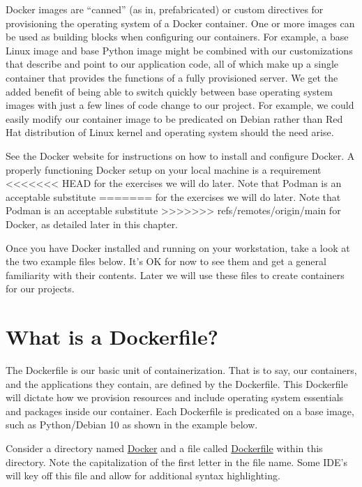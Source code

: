\justify{}
Docker images are ``canned'' (as in, prefabricated) or custom directives
for provisioning the operating system of a Docker container. One or more
images can be used as building blocks when configuring our containers.
For example, a base Linux image and base Python image might be combined
with our customizations that describe and point to our application code,
all of which make up a single container that provides the functions of
a fully provisioned server. We get the added
benefit of being able to switch quickly between base operating system
images with just a few lines of code change to our project. For example,
we could easily modify our container image to be predicated on Debian
rather than Red Hat distribution of Linux kernel and operating system
should the need arise.

\justify{}
See the Docker website for instructions on how to install and configure
Docker. A properly functioning Docker setup on your local machine is a requirement
<<<<<<< HEAD
for the exercises we will do later. Note that Podman is an acceptable substitute
=======
for the exercises we will do later. Note that Podman is an
acceptable substitute
>>>>>>> refs/remotes/origin/main
for Docker, as detailed later in this chapter.

\justify{}
Once you have Docker installed and running on your workstation, take a
look at the two example files below. It's OK for now to see them and get
a general familiarity with their contents. Later we will use these files
to create containers for our projects.

\section{What is a Dockerfile?}
\justify{}
The Dockerfile is our basic unit of containerization. That is to say,
our containers, and the applications they contain, are defined by the
Dockerfile. This Dockerfile will dictate how we provision resources and
include operating system essentials and packages inside our container.
Each Dockerfile is predicated on a base image, such as Python/Debian 10
as shown in the example below.

\justify{}
Consider a directory named
\href{https://github.com/hotpeppersec/rapid_secdev_framework/tree/master/docker}{Docker}
and a file called
\href{https://github.com/hotpeppersec/rapid_secdev_framework/blob/master/docker/Dockerfile}{Dockerfile}
within this directory. Note the capitalization of the first letter in the file name. Some IDE's will key off this file and allow for additional syntax highlighting.

